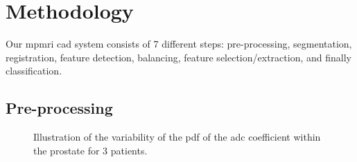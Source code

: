 \section{Methodology}\label{sec:chp6:method}

Our \ac{mpmri} \ac{cad} system consists of 7 different steps: pre-processing, segmentation, registration, feature detection, balancing, feature selection/extraction, and finally classification.

\subsection{Pre-processing}\label{subsec:chp6:method:PP}

\begin{figure}
  \hspace*{\fill}
  \hfill
  \hfill
  \hspace*{\fill}
  \caption[Illustration of the \acs*{pdf} of the \acs*{adc} coefficient within the prostate.]{Illustration of the variability of the \acs*{pdf} of the \acs*{adc} coefficient within the prostate for 3 patients.}
  \label{fig:adcpdf}
\end{figure}


